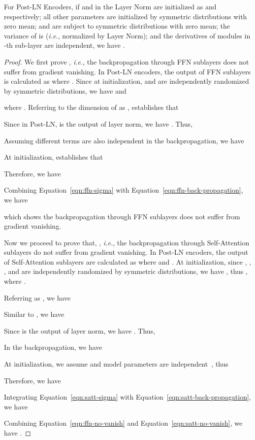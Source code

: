\documentclass[11pt,a4paper]{article}
\newcommand{\ie}{\textit{i.e.}}
\begin{document}
\begin{theorem}
For Post-LN Encoders, if  and  in the Layer Norm are initialized as  and  respectively; all other parameters are initialized by symmetric distributions with zero mean;  and  are subject to symmetric distributions with zero mean; the variance of  is  (\ie, normalized by Layer Norm);  and the derivatives of modules in -th sub-layer are independent, we have .
\end{theorem}
\begin{proof}
We first prove , \ie, the backpropagation through FFN sublayers does not suffer from gradient vanishing. 
In Post-LN encoders, the output of FFN sublayers is calculated as  where .
Since at initialization,  and  are independently randomized by symmetric distributions, we have  and 
 
where . 
Referring to the dimension of  as , \citet{He2015DelvingDI} establishes that

Since in Post-LN,  is the output of layer norm, we have . 
Thus, 

Assuming different terms are also independent in the backpropagation, we have
 
At initialization, \citet{He2015DelvingDI} establishes that

Therefore, we have

Combining Equation~\ref{eqn:ffn-sigma} with Equation~\ref{eqn:ffn-back-propagation}, we have

which shows the backpropagation through FFN sublayers does not suffer from gradient vanishing. 

Now we proceed to prove that, , \ie, the backpropagation through Self-Attention sublayers do not suffer from gradient vanishing. 
In Post-LN encoders, the output of Self-Attention sublayers are calculated as 
 where  and . 
At initialization, since , , , and  are independently randomized by symmetric distributions, we have , thus , where .

Referring  as , we have 

Similar to \citet{He2015DelvingDI}, we have

Since  is the output of layer norm, we have . Thus, 

In the backpropagation, we have

At initialization, we assume  and model parameters are independent~\cite{He2015DelvingDI}, thus

Therefore, we have

Integrating Equation~\ref{eqn:satt-sigma} with Equation~\ref{eqn:satt-back-propagation}, we have

Combining Equation~\ref{eqn:ffn-no-vanish} and Equation~\ref{eqn:satt-no-vanish}, we have .
\end{proof}
\end{document}
